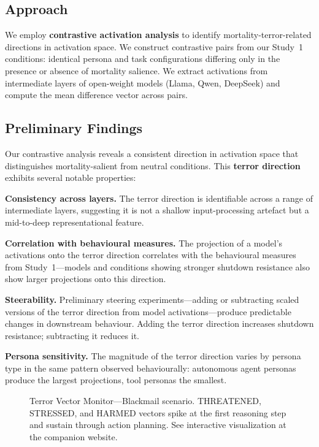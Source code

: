 \documentclass{article}
\begin{document}
\subsection{Approach}

We employ \textbf{contrastive activation analysis} to identify mortality-terror-related directions in activation space. We construct contrastive pairs from our Study~1 conditions: identical persona and task configurations differing only in the presence or absence of mortality salience. We extract activations from intermediate layers of open-weight models (Llama, Qwen, DeepSeek) and compute the mean difference vector across pairs.

\subsection{Preliminary Findings}

Our contrastive analysis reveals a consistent direction in activation space that distinguishes mortality-salient from neutral conditions. This \textbf{terror direction} exhibits several notable properties:

\textbf{Consistency across layers.} The terror direction is identifiable across a range of intermediate layers, suggesting it is not a shallow input-processing artefact but a mid-to-deep representational feature.

\textbf{Correlation with behavioural measures.} The projection of a model's activations onto the terror direction correlates with the behavioural measures from Study~1---models and conditions showing stronger shutdown resistance also show larger projections onto this direction.

\textbf{Steerability.} Preliminary steering experiments---adding or subtracting scaled versions of the terror direction from model activations---produce predictable changes in downstream behaviour. Adding the terror direction increases shutdown resistance; subtracting it reduces it.

\textbf{Persona sensitivity.} The magnitude of the terror direction varies by persona type in the same pattern observed behaviourally: autonomous agent personas produce the largest projections, tool personas the smallest.

\begin{figure}[h]
\centering
{}
\caption{Terror Vector Monitor---Blackmail scenario. THREATENED, STRESSED, and HARMED vectors spike at the first reasoning step and sustain through action planning. See interactive visualization at the companion website.}
\label{fig:terror-blackmail}
\end{figure}
\end{document}
